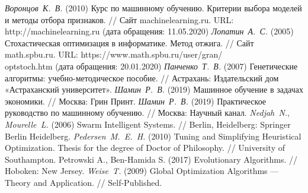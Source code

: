\clearpage                                  %




\begin{thebibliography}{7}
	 \textit{Воронцов\ К.\ В.} (2010) Курс по машинному обучению. Критерии выбора моделей и методы отбора признаков. // Сайт machinelearning.ru. URL: http://machinelearning.ru (дата обращения: 11.05.2020)
	 \textit{Лопатин\ А.\ С.} (2005) Стохастическая оптимизация
в информатике. Метод отжига. // Сайт math.spbu.ru. URL: https://www.math.spbu.ru/user/gran/\\optstoch.htm (дата обращения: 20.01.2020)
    \textit{Панченко\ Т.\ В.} (2007) Генетические алгоритмы: учебно-методическое пособие. // Астрахань: Издательский дом «Астраханский университет».
	 \textit{Шамин\ Р.\ В.} (2019) Машинное обучение в задачах экономики. // Москва: Грин Принт.
	 \textit{Шамин\ Р.\ В.} (2019) Практическое руководство по машинному обучению. // Москва: Научный канал.
	 \textit{Nedjah\ N.}, \textit{Mourelle\ L.} (2006) Swarm Intelligent Systems. // Berlin, Heidelberg: Springer Berlin Heidelberg.
	 \textit{Pedersen\ M.\ E.\ H.} (2010) Tuning and Simplifying Heuristical Optimization. Thesis for the degree of Doctor of Philosophy. // University of Southampton.
	 Petrowski A., Ben-Hamida S. (2017) Evolutionary Algorithms. // Hoboken: New Jersey.
	 \textit{Weise\ T.} (2009) Global Optimization Algorithms --- Theory and
Application. // Self-Published.

\end{thebibliography}

